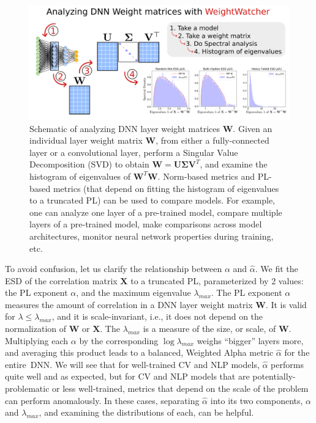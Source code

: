 \begin{figure}[t]
    \centering
    \includegraphics[width=15.0cm]{img/WeightWatcher_v3}
    \caption{Schematic of analyzing DNN layer weight matrices $\mathbf{W}$.  
             Given an individual layer weight matrix $\mathbf{W}$, from either a fully-connected layer or a convolutional layer, perform a Singular Value Decomposition (SVD) to obtain $\mathbf{W} = \mathbf{U} \mathbf{\Sigma} \mathbf{V}^{T}$, and examine the histogram of eigenvalues of $\mathbf{W}^{T}\mathbf{W}$.
             Norm-based metrics and PL-based metrics (that depend on fitting the histogram of eigenvalues to a truncated PL) can be used to compare models.
             For example, one can analyze one layer of a pre-trained model, compare multiple layers of a pre-trained model, make comparisons across model architectures, monitor neural network properties during training, etc. 
}
    \label{fig:ww}
\end{figure}



To avoid confusion, let us clarify the relationship between $\alpha$ and $\hat{\alpha}$.  
We fit the ESD of the correlation matrix $\mathbf{X}$ to a truncated PL, parameterized by 2 values: the PL exponent $\alpha$, and the maximum eigenvalue $\lambda_{max}$.
The PL exponent $\alpha$ measures the amount of correlation in a DNN layer weight matrix $\mathbf{W}$. 
It is valid for $\lambda\le\lambda_{max}$, and it is scale-invariant, i.e., it does not depend on the normalization of $\mathbf{W}$ or $\mathbf{X}$.
The $\lambda_{max}$ is a measure of the size, or scale, of $\mathbf{W}$.
Multiplying each $\alpha$ by the corresponding $\log\lambda_{max}$ weighs ``bigger'' layers more, and averaging this product leads to a balanced, Weighted Alpha metric $\hat{\alpha}$ for the entire~DNN.
We will see that for well-trained CV and NLP models, $\hat{\alpha}$ performs quite well and as expected, but for CV and NLP models that are potentially-problematic or less well-trained, metrics that depend on the scale of the problem can perform anomalously.  
In these cases, separating $\hat{\alpha}$ into its two components, $\alpha$ and $\lambda_{max}$, and examining the distributions of each, can be helpful.


